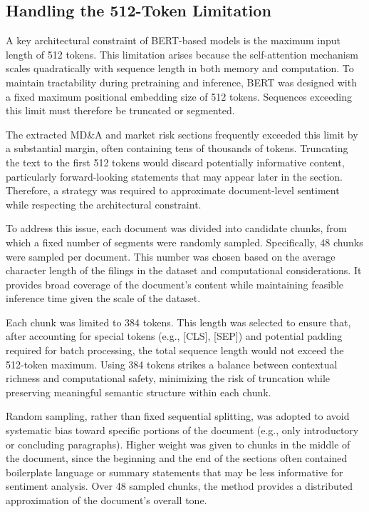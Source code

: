 \subsection*{Handling the 512-Token Limitation}

A key architectural constraint of BERT-based models is the maximum input length of 512 tokens. 
This limitation arises because the self-attention mechanism scales quadratically with sequence length in both memory and computation. 
To maintain tractability during pretraining and inference, BERT was designed with a fixed maximum positional embedding size of 512 tokens. 
Sequences exceeding this limit must therefore be truncated or segmented.

The extracted MD\&A and market risk sections frequently exceeded this limit by a substantial margin, often containing tens of thousands of tokens. 
Truncating the text to the first 512 tokens would discard potentially informative content, particularly forward-looking statements that may appear later in the section. 
Therefore, a strategy was required to approximate document-level sentiment while respecting the architectural constraint.

To address this issue, each document was divided into candidate chunks, from which a fixed number of segments were randomly sampled. 
Specifically, 48 chunks were sampled per document. 
This number was chosen based on the average character length of the filings in the dataset and computational considerations. 
It provides broad coverage of the document's content while maintaining feasible inference time given the scale of the dataset.

Each chunk was limited to 384 tokens. 
This length was selected to ensure that, after accounting for special tokens (e.g., [CLS], [SEP]) and potential padding required for batch processing, the total sequence length would not exceed the 512-token maximum. 
Using 384 tokens strikes a balance between contextual richness and computational safety, minimizing the risk of truncation while preserving meaningful semantic structure within each chunk.

Random sampling, rather than fixed sequential splitting, was adopted to avoid systematic bias toward specific portions of the document (e.g., only introductory or concluding paragraphs). 
Higher weight was given to chunks in the middle of the document, since the beginning and the end of the sections often contained boilerplate language or summary statements 
that may be less informative for sentiment analysis.
Over 48 sampled chunks, the method provides a distributed approximation of the document's overall tone.

